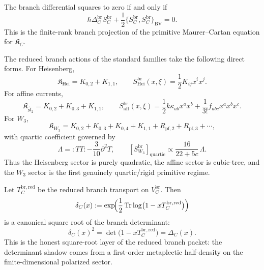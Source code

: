 \begin{proposition}
\label{prop:vol2-branch-qme}
The branch differential squares to zero if and only if
\[
\hbar\Delta^{\mathrm{br}}_C S^{\mathrm{br}}_C
+
\frac12\{S^{\mathrm{br}}_C,S^{\mathrm{br}}_C\}_{\mathrm{BV}}=0.
\]
This is the finite-rank branch projection of the primitive Maurer--Cartan equation for
$\mathfrak K_C$.
\end{proposition}

\begin{computation}
\label{comp:vol2-archetype-master-actions}
The reduced branch actions of the standard families take the following direct forms.
For Heisenberg,
\[
\mathfrak K_{\mathrm{Hei}}=K_{0,2}+K_{1,1},
\qquad
S^{\mathrm{br}}_{\mathrm{Hei}}(x,\xi)=\frac12 K_{ij}x^ix^j.
\]
For affine currents,
\[
\mathfrak K_{\widehat{\mathfrak{sl}}_2}=K_{0,2}+K_{0,3}+K_{1,1},
\qquad
S^{\mathrm{br}}_{\mathrm{aff}}(x,\xi)=\frac12 k\kappa_{ab}x^ax^b+\frac1{3!}f_{abc}x^ax^bx^c.
\]
For $W_3$,
\[
\mathfrak K_{W_3}=K_{0,2}+K_{0,3}+K_{0,4}+K_{1,1}+R_{\mathrm{pf},2}+R_{\mathrm{pf},3}+\cdots,
\]
with quartic coefficient governed by
\[
\Lambda={:}TT{:}-\frac{3}{10}\partial^2T,
\qquad
[S^{\mathrm{br}}_{W_3}]_{\mathrm{quartic}}
\propto
\frac{16}{22+5c}\,\Lambda.
\]
Thus the Heisenberg sector is purely quadratic, the affine sector is cubic-tree,
and the $W_3$ sector is the first genuinely quartic/rigid primitive regime.
\end{computation}

\begin{corollary}
\label{cor:vol2-metaplectic-square-root}
Let $T_C^{\mathrm{br,red}}$ be the reduced branch transport on $V_C^{\mathrm{br}}$.
Then
\begin{equation}
\label{eq:vol2-metaplectic-square-root}
\delta_C(x)
:=
\exp\!\Bigl(\frac12\operatorname{Tr}\log\bigl(1-xT_C^{\mathrm{br,red}}\bigr)\Bigr)
\end{equation}
is a canonical square root of the branch determinant:
\[
\delta_C(x)^2=
\det\bigl(1-xT_C^{\mathrm{br,red}}\bigr)=\Delta_C(x).
\]
This is the honest square-root layer of the reduced branch packet: the determinant shadow
comes from a first-order metaplectic half-density on the finite-dimensional polarized sector.
\end{corollary}
